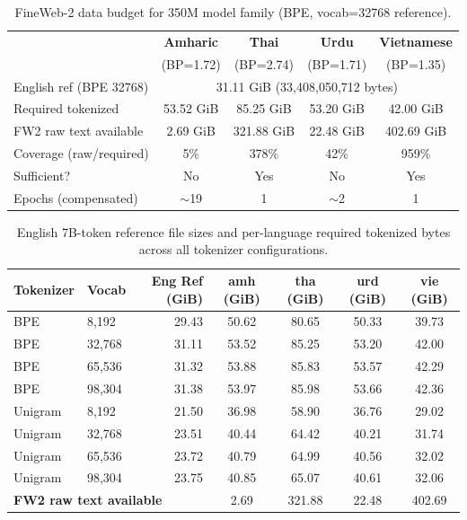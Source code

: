 \documentclass{article}
\begin{document}
\begin{table}[ht]
\centering
\caption{FineWeb-2 data budget for 350M model family (BPE, vocab=32768 reference).}
\label{tab:fw2-budget-summary}
\begin{tabular}{lcccc}
\toprule
 & \textbf{Amharic} & \textbf{Thai} & \textbf{Urdu} & \textbf{Vietnamese} \\
 & (BP=1.72) & (BP=2.74) & (BP=1.71) & (BP=1.35) \\
\midrule
English ref (BPE 32768) & \multicolumn{4}{c}{31.11 GiB (33,408,050,712 bytes)} \\
\midrule
Required tokenized & 53.52 GiB & 85.25 GiB & 53.20 GiB & 42.00 GiB \\
FW2 raw text available & 2.69 GiB & 321.88 GiB & 22.48 GiB & 402.69 GiB \\
Coverage (raw/required) & 5\% & 378\% & 42\% & 959\% \\
Sufficient? & No & Yes & No & Yes \\
Epochs (compensated) & $\sim$19 & 1 & $\sim$2 & 1 \\
\bottomrule
\end{tabular}
\end{table}

\begin{table}[ht]
\centering
\caption{English 7B-token reference file sizes and per-language required tokenized bytes across all tokenizer configurations.}
\label{tab:fw2-budget-full}
\small
\begin{tabular}{llrcccc}
\toprule
\textbf{Tokenizer} & \textbf{Vocab} & \textbf{Eng Ref (GiB)} & \textbf{amh (GiB)} & \textbf{tha (GiB)} & \textbf{urd (GiB)} & \textbf{vie (GiB)} \\
\midrule
BPE & 8,192 & 29.43 & 50.62 & 80.65 & 50.33 & 39.73 \\
BPE & 32,768 & 31.11 & 53.52 & 85.25 & 53.20 & 42.00 \\
BPE & 65,536 & 31.32 & 53.88 & 85.83 & 53.57 & 42.29 \\
BPE & 98,304 & 31.38 & 53.97 & 85.98 & 53.66 & 42.36 \\
\midrule
Unigram & 8,192 & 21.50 & 36.98 & 58.90 & 36.76 & 29.02 \\
Unigram & 32,768 & 23.51 & 40.44 & 64.42 & 40.21 & 31.74 \\
Unigram & 65,536 & 23.72 & 40.79 & 64.99 & 40.56 & 32.02 \\
Unigram & 98,304 & 23.75 & 40.85 & 65.07 & 40.61 & 32.06 \\
\midrule
\multicolumn{3}{l}{\textbf{FW2 raw text available}} & 2.69 & 321.88 & 22.48 & 402.69 \\
\bottomrule
\end{tabular}
\end{table}
\end{document}
